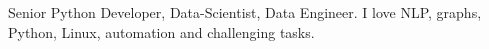 

\begin{cvparagraph}

Senior Python Developer, Data-Scientist, Data Engineer. I love NLP, graphs, Python, Linux, automation and challenging tasks.
\end{cvparagraph}
